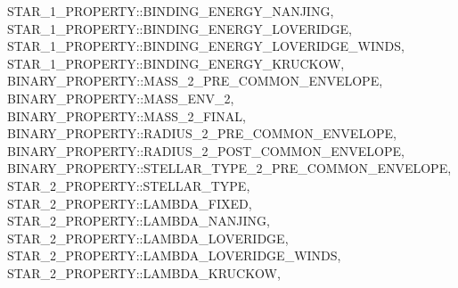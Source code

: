 \begin{minipage}{\dimexpr\textwidth-2em}
    STAR\_1\_PROPERTY::BINDING\_ENERGY\_NANJING, \\
    STAR\_1\_PROPERTY::BINDING\_ENERGY\_LOVERIDGE, \\
    STAR\_1\_PROPERTY::BINDING\_ENERGY\_LOVERIDGE\_WINDS, \\
    STAR\_1\_PROPERTY::BINDING\_ENERGY\_KRUCKOW, \\
    BINARY\_PROPERTY::MASS\_2\_PRE\_COMMON\_ENVELOPE, \\
    BINARY\_PROPERTY::MASS\_ENV\_2, \\
    BINARY\_PROPERTY::MASS\_2\_FINAL, \\
    BINARY\_PROPERTY::RADIUS\_2\_PRE\_COMMON\_ENVELOPE, \\
    BINARY\_PROPERTY::RADIUS\_2\_POST\_COMMON\_ENVELOPE, \\
    BINARY\_PROPERTY::STELLAR\_TYPE\_2\_PRE\_COMMON\_ENVELOPE, \\
    STAR\_2\_PROPERTY::STELLAR\_TYPE, \\
    STAR\_2\_PROPERTY::LAMBDA\_FIXED, \\
    STAR\_2\_PROPERTY::LAMBDA\_NANJING, \\
    STAR\_2\_PROPERTY::LAMBDA\_LOVERIDGE, \\
    STAR\_2\_PROPERTY::LAMBDA\_LOVERIDGE\_WINDS, \\
    STAR\_2\_PROPERTY::LAMBDA\_KRUCKOW,
\end{minipage}

